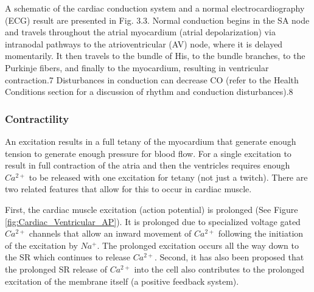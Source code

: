 
A schematic of the cardiac conduction system and a normal electrocardiography (ECG) result are presented in Fig. 3.3. Normal conduction begins in the SA node and travels throughout the atrial myocardium (atrial depolarization) via intranodal pathways to the atrioventricular (AV) node, where it is delayed momentarily. It then travels to the bundle of His, to the bundle branches, to the Purkinje fibers, and finally to the myocardium, resulting in ventricular contraction.7 Disturbances in conduction can decrease CO (refer to the Health Conditions section for a discussion of rhythm and conduction disturbances).8

\subsubsection{Contractility}

An excitation results in a full tetany of the myocardium that generate enough tension to generate enough pressure for blood flow. For a single excitation to result in full contraction of the atria and then the ventricles requires enough $Ca^{2+}$ to be released with one excitation for tetany (not just a twitch). There are two related features that allow for this to occur in cardiac muscle. 

First, the cardiac muscle excitation (action potential) is prolonged (See Figure \ref{fig:Cardiac_Ventricular_AP}). It is prolonged due to specialized voltage gated $Ca^{2+}$ channels that allow an inward movement of $Ca^{2+}$ following the initiation of the excitation by $Na^+$. The prolonged excitation occurs all the way down to the SR which continues to release $Ca^{2+}$. Second, it has also been proposed that the prolonged SR release of $Ca^{2+}$ into the cell also contributes to the prolonged excitation of the membrane itself (a positive feedback system). 

